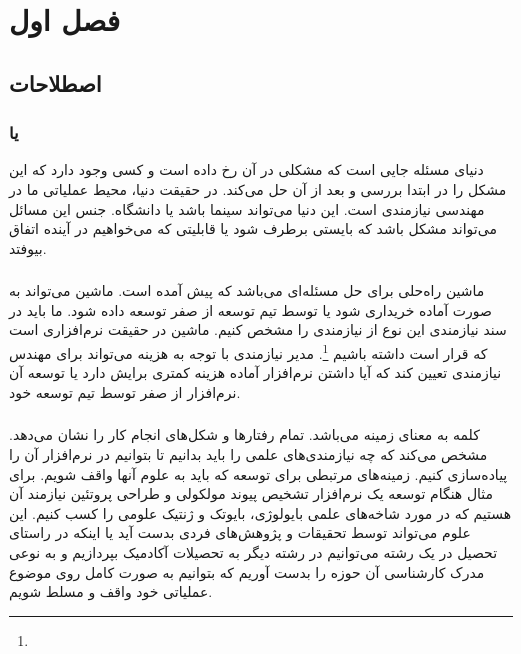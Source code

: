 
\section{فصل اول}

\subsection{اصطلاحات}

\subsubsection{ یا }

دنیای مسئله جایی است که مشکلی در آن رخ داده است و کسی وجود دارد که این مشکل را
در ابتدا بررسی و بعد از آن حل می‌کند. در حقیقت دنیا، محیط عملیاتی ما در مهندسی
نیازمندی است. این دنیا می‌تواند سینما باشد یا دانشگاه. جنس این مسائل می‌تواند
مشکل باشد که بایستی برطرف شود یا قابلیتی که می‌خواهیم در آینده اتفاق بیوفتد.

\subsubsection{}

ماشین راه‌حلی برای حل مسئله‌ای می‌باشد که پیش آمده است. ماشین می‌تواند به صورت
آماده خریداری شود یا توسط تیم توسعه از صفر توسعه داده شود. ما باید در سند
نیازمندی این نوع از نیازمندی را مشخص کنیم. ماشین در حقیقت نرم‌افزاری است که قرار
است داشته باشیم \footnote{}. مدیر نیازمندی با توجه به هزینه
می‌تواند برای مهندس نیازمندی تعیین کند که آیا داشتن نرم‌افزار آماده هزینه کمتری
برایش دارد یا توسعه آن نرم‌افزار از صفر توسط تیم توسعه خود.

\subsubsection{}

کلمه  به معنای زمینه می‌باشد. تمام رفتار‌ها و شکل‌های انجام کار را
نشان می‌دهد. مشخص می‌کند که چه نیازمندی‌های علمی را باید بدانیم تا بتوانیم در
نرم‌افزار آن را پیاده‌سازی کنیم. زمینه‌های مرتبطی برای توسعه‌ که باید به علوم
آنها واقف شویم. برای مثال هنگام توسعه یک نرم‌افزار تشخیص پیوند مولکولی و طراحی
پروتئین نیازمند آن هستیم که در مورد شاخه‌های علمی بایولوژی، بایوتک و ژنتیک علومی
را کسب کنیم. این علوم می‌تواند توسط تحقیقات و پژوهش‌های فردی بدست آید یا اینکه
در راستای تحصیل در یک رشته می‌توانیم در رشته دیگر به تحصیلات آکادمیک بپردازیم و
به نوعی مدرک کارشناسی آن حوزه را بدست آوریم که بتوانیم به صورت کامل روی موضوع
عملیاتی خود واقف و مسلط شویم.

